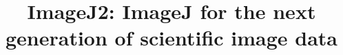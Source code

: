 \documentclass{bmcart}
\begin{document}
\begin{frontmatter}

\begin{fmbox}


\title{ImageJ2: ImageJ for the next generation of scientific image data}


\author[
   addressref={aff1}
]{ }
\author[
   addressref={aff1,aff2}
]{ }
\author[
   addressref={aff1}
]{ }
\author[
   addressref={aff1}
]{ }
\author[
   addressref={aff1}
]{ }
\author[
   addressref={aff1,aff2},
   email={eliceiri@wisc.edu}
]{ }


\address[id=aff1]{%
  ,
  ,
  ,
}
\address[id=aff2]{%
  ,
  ,
  ,
}

\end{fmbox}%


\end{frontmatter}
\end{document}
